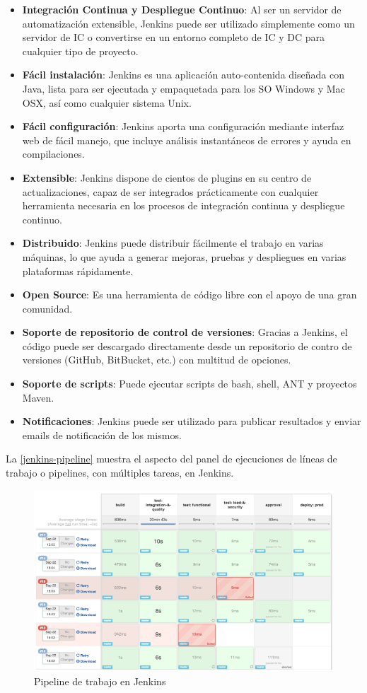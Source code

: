 \begin{itemize}
	\item \textbf{Integración Continua y Despliegue Continuo}: Al ser un servidor de automatización extensible, Jenkins puede ser utilizado simplemente como un servidor de \gls{IC} o convertirse en un entorno completo de \gls{IC} y \gls{DC} para cualquier tipo de proyecto.
	\item \textbf{Fácil instalación}: Jenkins es una aplicación auto-contenida diseñada con Java, lista para ser ejecutada y empaquetada para los \gls{SO} Windows y Mac OSX, así como cualquier sistema Unix.
	\item \textbf{Fácil configuración}: Jenkins aporta una configuración mediante interfaz web de fácil manejo, que incluye análisis instantáneos de errores y ayuda en compilaciones.
	\item \textbf{Extensible}: Jenkins dispone de cientos de plugins en su centro de actualizaciones, capaz de ser integrados prácticamente con cualquier herramienta necesaria en los procesos de integración continua y despliegue continuo.
	\item \textbf{Distribuido}: Jenkins puede distribuir fácilmente el trabajo en varias máquinas, lo que ayuda a generar mejoras, pruebas y despliegues en varias plataformas rápidamente.
	\item \textbf{Open Source}: Es una herramienta de código libre con el apoyo de una gran comunidad.
	\item \textbf{Soporte de repositorio de control de versiones}: Gracias a Jenkins, el código puede ser descargado directamente desde un repositorio de contro de versiones (GitHub, BitBucket, etc.) con multitud de opciones.
	\item \textbf{Soporte de scripts}: Puede ejecutar scripts de bash, shell, ANT y proyectos Maven.
	\item \textbf{Notificaciones}: Jenkins puede ser utilizado para publicar resultados y enviar emails de notificación de los mismos.
\end{itemize}

La \autoref{jenkins-pipeline} muestra el aspecto del panel de ejecuciones de líneas de trabajo o pipelines, con múltiples tareas, en Jenkins.

\begin{figure}[htbp]
	\centering
	\includegraphics[width=0.80\linewidth]
	{entorno/figuras/jenkins-pipeline.png}
	\caption{Pipeline de trabajo en Jenkins}
	\label{jenkins-pipeline}
\end{figure}

